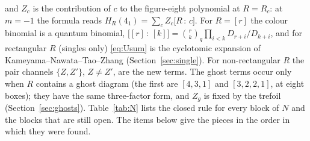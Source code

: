 \documentclass[11pt]{article}
\newcommand{\cf}[2]{\bigl[#1\,{:}\,#2\bigr]}
\begin{document}
and $Z_c$ is the contribution of $c$ to the figure-eight polynomial at $R=R_c$: at $m=-1$ the formula reads
$H_R(4_1)=\sum_cZ_c\cf Rc$.  For $R=[r]$ the colour binomial is a quantum binomial,
$\cf{[r]}{[k]}=\binom rk_q\prod_{i<k}D_{r+i}/D_{k+i}$, and for rectangular $R$ (singles only) \eqref{eq:Usum} is the
cyclotomic expansion of Kameyama--Nawata--Tao--Zhang (Section~\ref{sec:single}).  For non-rectangular $R$ the pair channels
$\{Z,Z'\}$, $Z\ne Z'$, are the new terms.  The ghost terms occur only when $R$ contains a ghost diagram (the first are
$[4,3,1]$ and $[3,2,2,1]$, at eight boxes); they have the same three-factor form, and $Z_g$ is fixed by the trefoil
(Section~\ref{sec:ghosts}).  Table~\ref{tab:N} lists the closed rule for every block of $N$ and the blocks that are still
open.  The items below give the pieces in the order in which they were found.
\end{document}
